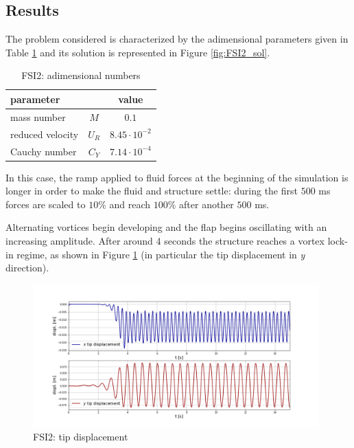 \subsection{Results}

The problem considered is characterized by the adimensional parameters given in Table \ref{table:FSI2-adim} and its solution is represented in Figure \ref{fig:FSI2_sol}.

\begin{table}[!htb]
	\begin{center}
		\begin{tabular}{ l c | c } 
			parameter & & value   \\ 
			\hline
			mass number  & $M$ & $0.1$     \\
			reduced velocity & $U_R$ & $ 8.45\cdot 10^{-2}$  \\
			Cauchy number  & $C_Y$ & $  7.14 \cdot 10^{-4}$  \\			
		\end{tabular}
	\end{center}
	\caption{FSI2: adimensional numbers}
	\label{table:FSI2-adim}
\end{table}

In this case, the ramp applied to fluid forces at the beginning of the simulation is longer in order to make the fluid and structure settle: during the first $500$ \si{ms} forces are scaled to $10\%$ and reach $100\%$ after another $500$ \si{ms}.

Alternating vortices begin developing and the flap begins oscillating with an increasing amplitude. After around 4 seconds the structure reaches a vortex lock-in regime, as shown in Figure \ref{fig:FSI2_displacement} (in particular the tip displacement in \textit{y} direction).


\begin{figure}[htbp!]
	\centering
	\includegraphics[width=0.98\textwidth, trim=20 20 50 50, clip]{images/FSI2/disp_fsi2.png}
	\caption{FSI2: tip displacement}
	\label{fig:FSI2_displacement}
\end{figure}

